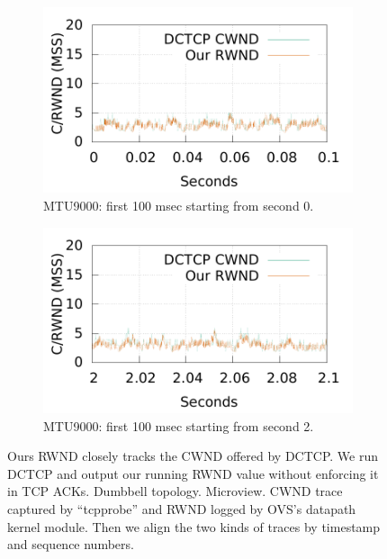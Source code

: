 \begin{figure}[!htb]
	\begin{subfigure}[b]{0.225\textwidth}
                \centering
                \includegraphics[width=\textwidth]{figures/cwnd_rwnd/newpara_refine/mtu9000_5flows_1/measure_cwnd_rwnd_gap_9k_5flows_0sec_100msec.pdf}
                \caption{MTU9000: first 100 msec starting from second 0.}
                \label{cwnd_rwnd_9000_0sec}
        \end{subfigure}
        \begin{subfigure}[b]{0.225\textwidth}
                \centering
                \includegraphics[width=\textwidth]{figures/cwnd_rwnd/newpara_refine/mtu9000_5flows_1/measure_cwnd_rwnd_gap_9k_5flows_2sec_100msec.pdf}
                \caption{MTU9000: first 100 msec starting from second 2.}
                \label{cwnd_rwnd_9000_2sec}
        \end{subfigure}
        \caption{Ours RWND closely tracks the CWND offered by DCTCP. We run DCTCP and output our running RWND value
		without enforcing it in TCP ACKs. Dumbbell topology. Microview. CWND trace captured by ``tcpprobe'' and
		RWND logged by OVS's datapath kernel module. Then we align the two kinds of traces by timestamp and sequence numbers.}
        \label{compare_cwnd_rwnd}
\end{figure}



